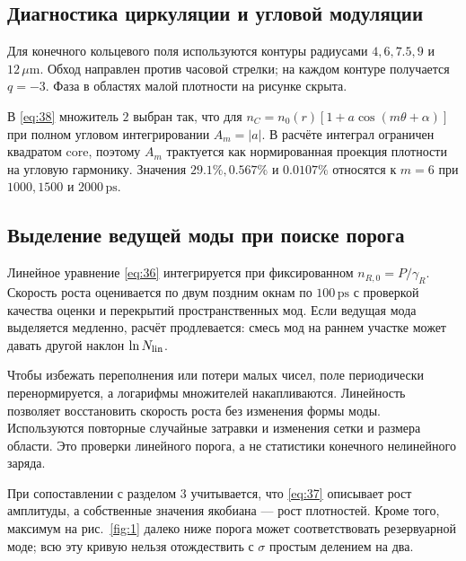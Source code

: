 \documentclass[12pt,a4paper]{article}
\begin{document}
\subsection{Диагностика циркуляции и угловой модуляции}\label{sec:A.5}

Для конечного кольцевого поля используются контуры радиусами $4, 6, 7.5, 9$ и $12\,\mu\mathrm m$. Обход направлен против часовой стрелки; на каждом контуре получается \mbox{$q=-3$}. Фаза в областях малой плотности на рисунке скрыта.

В \eqref{eq:38} множитель $2$ выбран так, что для $n_{C}=n_{0}(r)[1+a \cos(m \theta+\alpha)]$ при полном угловом интегрировании $A_{m}=|a|$. В расчёте интеграл ограничен квадратом $\mathrm{core}$, поэтому $A_{m}$ трактуется как нормированная проекция плотности на угловую гармонику. Значения $29.1\%, 0.567\%$ и $0.0107\%$ относятся к $m=6$ при $1000, 1500$ и $2000\,\mathrm{ps}$.

\subsection{Выделение ведущей моды при поиске порога}\label{sec:A.6}

Линейное уравнение \eqref{eq:36} интегрируется при фиксированном $n_{R,0}=P/\gamma_{R}$. Скорость роста оценивается по двум поздним окнам по $100\,\mathrm{ps}$ с проверкой качества оценки и перекрытий пространственных мод. Если ведущая мода выделяется медленно, расчёт продлевается: смесь мод на раннем участке может давать другой наклон $\ln N_{\rm lin}$.

Чтобы избежать переполнения или потери малых чисел, поле периодически перенормируется, а логарифмы множителей накапливаются. Линейность позволяет восстановить скорость роста без изменения формы моды. Используются повторные случайные затравки и изменения сетки и размера области. Это проверки линейного порога, а не статистики конечного нелинейного заряда.

При сопоставлении с разделом $3$ учитывается, что \eqref{eq:37} описывает рост амплитуды, а собственные значения якобиана --- рост плотностей. Кроме того, максимум на рис.~\ref{fig:1} далеко ниже порога может соответствовать резервуарной моде; всю эту кривую нельзя отождествить с $\sigma$ простым делением на два.

\clearpage

\renewcommand{\thesection}{Приложение Б.}
\renewcommand{\thesubsection}{Б.\arabic{subsection}}
\renewcommand{\theequation}{Б.\arabic{equation}}
\renewcommand{\theHequation}{B.\arabic{equation}}
\setcounter{equation}{0}
\end{document}
